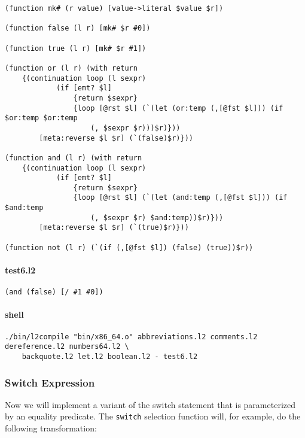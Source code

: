 \documentclass[]{article}
\let\oldparagraph\paragraph
\renewcommand{\paragraph}[1]{\oldparagraph{#1}\mbox{}}
\begin{document}
\begin{verbatim}
(function mk# (r value) [value->literal $value $r])

(function false (l r) [mk# $r #0])

(function true (l r) [mk# $r #1])

(function or (l r) (with return
    {(continuation loop (l sexpr)
            (if [emt? $l]
                {return $sexpr}
                {loop [@rst $l] (`(let (or:temp (,[@fst $l])) (if $or:temp $or:temp
                    (, $sexpr $r)))$r)}))
        [meta:reverse $l $r] (`(false)$r)}))

(function and (l r) (with return
    {(continuation loop (l sexpr)
            (if [emt? $l]
                {return $sexpr}
                {loop [@rst $l] (`(let (and:temp (,[@fst $l])) (if $and:temp
                    (, $sexpr $r) $and:temp))$r)}))
        [meta:reverse $l $r] (`(true)$r)}))

(function not (l r) (`(if (,[@fst $l]) (false) (true))$r))
\end{verbatim}

\hypertarget{test6.l2}{%
\paragraph{test6.l2}\label{test6.l2}}

\begin{verbatim}
(and (false) [/ #1 #0])
\end{verbatim}

\hypertarget{shell-5}{%
\paragraph{shell}\label{shell-5}}

\begin{verbatim}
./bin/l2compile "bin/x86_64.o" abbreviations.l2 comments.l2 dereference.l2 numbers64.l2 \
    backquote.l2 let.l2 boolean.l2 - test6.l2
\end{verbatim}

\hypertarget{switch-expression}{%
\subsubsection{Switch Expression}\label{switch-expression}}

Now we will implement a variant of the switch statement that is
parameterized by an equality predicate. The \texttt{switch} selection
function will, for example, do the following transformation:
\end{document}
